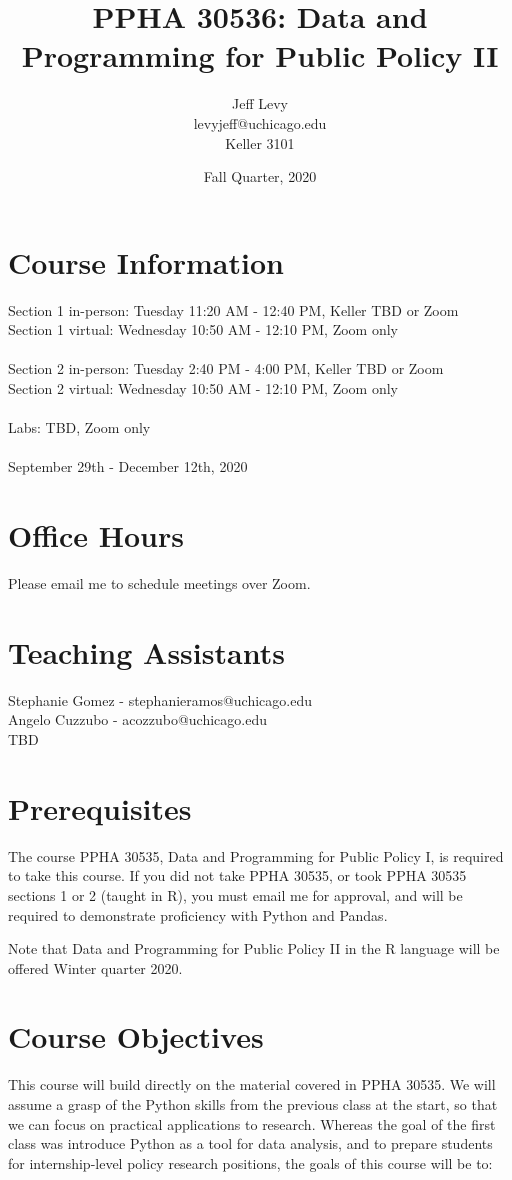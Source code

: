 \documentclass{article}
\author{
Jeff Levy\\
levyjeff@uchicago.edu\\
Keller 3101
}
\title{PPHA 30536: Data and Programming for Public Policy II}
\date{Fall Quarter, 2020}
\begin{document}
\maketitle

\section*{Course Information}
Section 1 in-person: Tuesday 11:20 AM - 12:40 PM, Keller TBD or Zoom \\
Section 1 virtual: Wednesday 10:50 AM - 12:10 PM, Zoom only \\ 
 \\
Section 2 in-person: Tuesday 2:40 PM - 4:00 PM, Keller TBD or Zoom \\
Section 2 virtual: Wednesday 10:50 AM - 12:10 PM, Zoom only \\
 \\
Labs: TBD, Zoom only \\
 \\
September 29th - December 12th, 2020

\section*{Office Hours}
Please email me to schedule meetings over Zoom.

\section*{Teaching Assistants}
Stephanie Gomez - stephanieramos@uchicago.edu \\
Angelo Cuzzubo - acozzubo@uchicago.edu \\
TBD

\section*{Prerequisites}
The course PPHA 30535, Data and Programming for Public Policy I, is required to take this course.  If you did not take PPHA 30535, or took PPHA 30535 sections 1 or 2 (taught in R), you must email me for approval, and will be required to demonstrate proficiency with Python and Pandas.

Note that Data and Programming for Public Policy II in the R language will be offered Winter quarter 2020.

\section*{Course Objectives}
This course will build directly on the material covered in PPHA 30535.  We will assume a grasp of the Python skills from the previous class at the start, so that we can focus on practical applications to research.  Whereas the goal of the first class was introduce Python as a tool for data analysis, and to prepare students for internship-level policy research positions, the goals of this course will be to:
\end{document}
